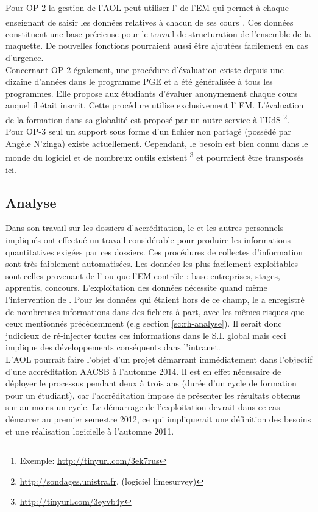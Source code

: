 \documentclass{book}
\begin{document}
Pour OP-2 la gestion de l'AOL peut utiliser l' de l'EM qui
permet à chaque enseignant de saisir les données relatives à chacun de ses 
cours\footnote{Exemple: \url{http://tinyurl.com/3ek7rus}}. Ces données 
constituent une base précieuse pour le travail de structuration de l'ensemble
de la maquette. De nouvelles fonctions pourraient aussi être ajoutées facilement
en cas d'urgence.\\

Concernant OP-2 également, une procédure d'évaluation existe depuis une dizaine 
d'années dans le programme PGE et a été généralisée à tous les programmes. Elle 
propose aux étudiants d'évaluer anonymement chaque cours auquel il était inscrit. 
Cette procédure utilise exclusivement l' EM.
L'évaluation de la formation dans sa globalité est proposé par un autre service à l'UdS%
\footnote{\url{http://sondages.unistra.fr}, (logiciel limesurvey)}.\\

Pour OP-3 seul un support sous forme d'un fichier  non partagé (possédé par Angèle 
N'zinga) existe actuellement. Cependant, le besoin est
bien connu dans le monde du logiciel et de nombreux outils existent%
\footnote{\url{http://tinyurl.com/3eyvb4y}}
et pourraient être transposés ici.


\subsection{Analyse}
\label{sc:sop-analyse}

Dans son travail sur les dossiers d'accréditation, le \sop et les autres
personnels impliqués ont effectué un travail considérable pour produire
les informations quantitatives exigées par ces dossiers. Ces procédures
de collectes d'information sont très faiblement automatisées. Les données
les plus facilement exploitables sont celles provenant de l'
ou que l'EM contrôle : base entreprises, stages, apprentis, concours. 
L'exploitation des données nécessite quand même l'intervention de \CK. 
Pour les données qui étaient hors de ce champ, le \sop a enregistré de
nombreuses informations dans des fichiers à part, avec les mêmes risques
que ceux mentionnés précédemment (e.g section \ref{sc:rh-analyse}). 
Il serait donc judicieux de ré-injecter toutes ces informations dans le S.I.
global mais ceci implique des développements conséquents dans l'intranet.\\


L'AOL pourrait faire l'objet d'un projet démarrant immédiatement dans
l'objectif d'une accréditation AACSB à l'automne 2014. Il est en effet 
nécessaire de déployer le processus pendant deux à trois ans (durée
d'un cycle de formation pour un étudiant), car l'accréditation impose de
présenter les résultats obtenus sur au moins un cycle. Le démarrage de
l'exploitation devrait dans ce cas démarrer au premier semestre 2012,
ce qui impliquerait une définition des besoins et une réalisation logicielle
à l'automne 2011.
\end{document}
